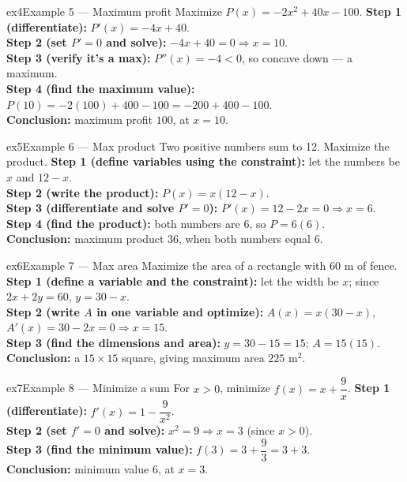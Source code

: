 \documentclass[11pt]{article}
\begin{document}
\begin{example}{ex4}{Example 5 --- Maximum profit}
Maximize $P(x)=-2x^2+40x-100$.\soln
\textbf{Step 1 (differentiate):} $P'(x)=-4x+40$.\\[3pt]
\textbf{Step 2 (set $P'=0$ and solve):} $-4x+40=0\Rightarrow x=10$.\\[3pt]
\textbf{Step 3 (verify it's a max):} $P''(x)=-4<0$, so concave down --- a maximum.\\[3pt]
\textbf{Step 4 (find the maximum value):} $P(10)=-2(100)+400-100=-200+400-100$.\\[3pt]
\textbf{Conclusion:} maximum profit $100$, at $x=10$.
\end{example}

\begin{example}{ex5}{Example 6 --- Max product}
Two positive numbers sum to 12. Maximize the product.\soln
\textbf{Step 1 (define variables using the constraint):} let the numbers be $x$ and $12-x$.\\[3pt]
\textbf{Step 2 (write the product):} $P(x)=x(12-x)$.\\[3pt]
\textbf{Step 3 (differentiate and solve $P'=0$):} $P'(x)=12-2x=0\Rightarrow x=6$.\\[3pt]
\textbf{Step 4 (find the product):} both numbers are $6$, so $P=6(6)$.\\[3pt]
\textbf{Conclusion:} maximum product $36$, when both numbers equal $6$.
\end{example}

\begin{example}{ex6}{Example 7 --- Max area}
Maximize the area of a rectangle with 60 m of fence.\soln
\textbf{Step 1 (define a variable and the constraint):} let the width be $x$; since $2x+2y=60$, $y=30-x$.\\[3pt]
\textbf{Step 2 (write $A$ in one variable and optimize):} $A(x)=x(30-x)$, $A'(x)=30-2x=0\Rightarrow x=15$.\\[3pt]
\textbf{Step 3 (find the dimensions and area):} $y=30-15=15$; $A=15(15)$.\\[3pt]
\textbf{Conclusion:} a $15\times15$ square, giving maximum area $225$ m$^2$.
\end{example}

\begin{example}{ex7}{Example 8 --- Minimize a sum}
For $x>0$, minimize $f(x)=x+\dfrac{9}{x}$.\soln
\textbf{Step 1 (differentiate):} $f'(x)=1-\dfrac{9}{x^2}$.\\[3pt]
\textbf{Step 2 (set $f'=0$ and solve):} $x^2=9\Rightarrow x=3$ (since $x>0$).\\[3pt]
\textbf{Step 3 (find the minimum value):} $f(3)=3+\dfrac93=3+3$.\\[3pt]
\textbf{Conclusion:} minimum value $6$, at $x=3$.
\end{example}
\end{document}
